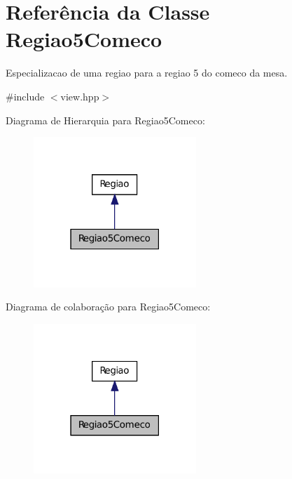 \hypertarget{classRegiao5Comeco}{
\section{Referência da Classe Regiao5Comeco}
\label{classRegiao5Comeco}
}


Especializacao de uma regiao para a regiao 5 do comeco da mesa.  




{\ttfamily \#include $<$view.hpp$>$}



Diagrama de Hierarquia para Regiao5Comeco:\nopagebreak
\begin{figure}[H]
\begin{center}
\leavevmode
\includegraphics[width=174pt]{classRegiao5Comeco__inherit__graph}
\end{center}
\end{figure}


Diagrama de colaboração para Regiao5Comeco:\nopagebreak
\begin{figure}[H]
\begin{center}
\leavevmode
\includegraphics[width=174pt]{classRegiao5Comeco__coll__graph}
\end{center}
\end{figure}

